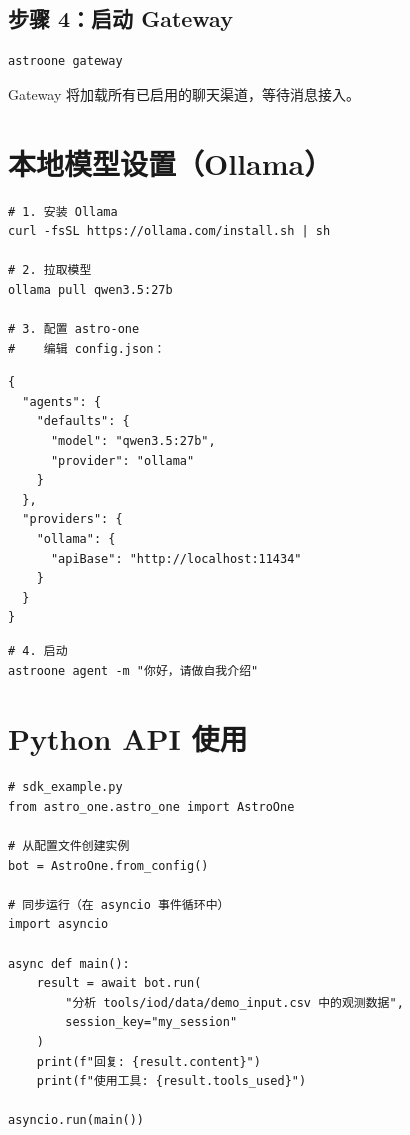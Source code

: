 \documentclass[12pt,a4paper,UTF8]{ctexart}
\begin{document}
\subsection{步骤 4：启动 Gateway}
\begin{verbatim}
astroone gateway
\end{verbatim}
Gateway 将加载所有已启用的聊天渠道，等待消息接入。

\section{本地模型设置（Ollama）}

\begin{verbatim}
# 1. 安装 Ollama
curl -fsSL https://ollama.com/install.sh | sh

# 2. 拉取模型
ollama pull qwen3.5:27b

# 3. 配置 astro-one
#    编辑 config.json：
\end{verbatim}

\begin{verbatim}
{
  "agents": {
    "defaults": {
      "model": "qwen3.5:27b",
      "provider": "ollama"
    }
  },
  "providers": {
    "ollama": {
      "apiBase": "http://localhost:11434"
    }
  }
}
\end{verbatim}

\begin{verbatim}
# 4. 启动
astroone agent -m "你好，请做自我介绍"
\end{verbatim}

\section{Python API 使用}

\begin{verbatim}
# sdk_example.py
from astro_one.astro_one import AstroOne

# 从配置文件创建实例
bot = AstroOne.from_config()

# 同步运行（在 asyncio 事件循环中）
import asyncio

async def main():
    result = await bot.run(
        "分析 tools/iod/data/demo_input.csv 中的观测数据",
        session_key="my_session"
    )
    print(f"回复: {result.content}")
    print(f"使用工具: {result.tools_used}")

asyncio.run(main())
\end{verbatim}

\end{document}
